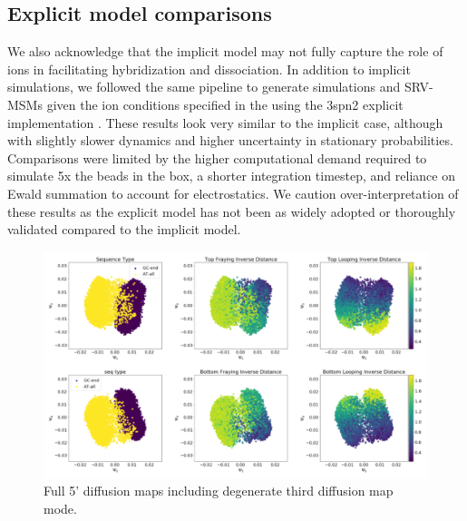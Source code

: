 \documentclass[journal=jpcbfk,manuscript=article]{achemso}
\begin{document}
\subsection{Explicit model comparisons}

We also acknowledge that the implicit model may not fully capture the role of ions in facilitating hybridization and dissociation. In addition to implicit simulations, we followed the same pipeline to generate simulations and SRV-MSMs given the ion conditions specified in the \citet{Sanstead2016} using the 3spn2 explicit implementation \citep{Hinckley2015}. These results look very similar to the implicit case, although with slightly slower dynamics and higher uncertainty in stationary probabilities. Comparisons were limited by the higher computational demand required to simulate 5x the beads in the box, a shorter integration timestep, and reliance on Ewald summation to account for electrostatics. We caution over-interpretation of these results as the explicit model has not been as widely adopted or thoroughly validated compared to the implicit model.


\begin{figure}[ht!]
	\begin{center}
        \includegraphics[width=\textwidth]{Figs/figs_imp/GC-end_dmaps_full.PNG}
        \caption{Full 5' diffusion maps including degenerate third diffusion map mode.}
        \label{fig:GC-end_dmaps_full}
	\end{center}
\end{figure}
\end{document}

